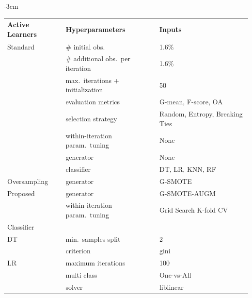 \documentclass[preprint, 12pt]{elsarticle}
\begin{document}
\begin{table}[H]
	\centering
    \addtolength{\leftskip} {-3cm}
    \addtolength{\rightskip}{-3cm}
	\begin{tabular}{lll}
		\toprule
		Active Learners & Hyperparameters                   & Inputs                         \\
		\midrule
		Standard        & \# initial obs.\                  & 1.6\%                          \\
                        & \# additional obs.\ per iteration & 1.6\%                          \\
                        & max.\ iterations + initialization & 50                             \\
                        & evaluation metrics                & G-mean, F-score, OA            \\
                        & selection strategy                & Random, Entropy, Breaking Ties \\
                        & within-iteration param.\ tuning   & None                           \\
                        & generator                         & None                           \\
                        & classifier                        & DT, LR, KNN, RF                \\
        Oversampling    & generator                         & G-SMOTE                        \\
        Proposed        & generator                         & G-SMOTE-AUGM                   \\
                        & within-iteration param.\ tuning   & Grid Search K-fold CV          \\
		\toprule
		Classifier      &                                  &                                \\
		\midrule
        DT              & min.\ samples split              & 2                              \\
                        & criterion                        & gini                           \\
		LR              & maximum iterations               & 100                            \\
                        & multi class                      & One-vs-All                     \\
		                & solver                           & liblinear                      \\

\end{tabular}
\end{table}
\end{document}
